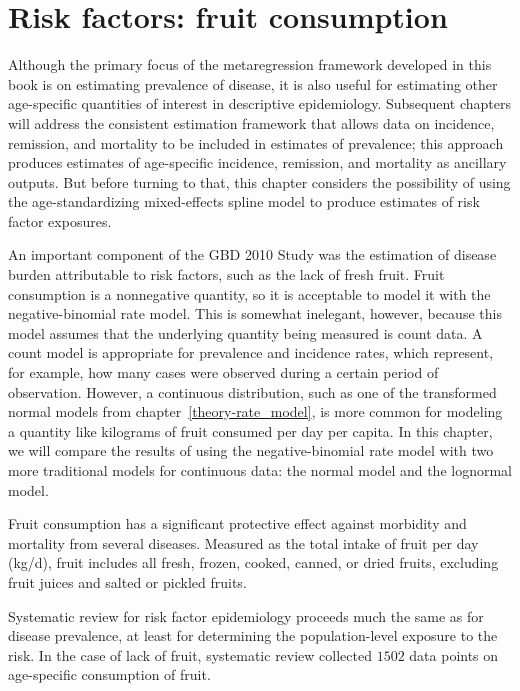 \chapter{Risk factors: fruit consumption}
\label{applications-log_normal}

Although the primary focus of the metaregression framework developed
in this book is on estimating prevalence of disease, it is also
useful for estimating other age-specific quantities of interest in
descriptive epidemiology.  Subsequent chapters will address the
consistent estimation framework that allows data on incidence,
remission, and mortality to be included in estimates of prevalence;
this approach produces estimates of age-specific incidence, remission,
and mortality as ancillary outputs.  But before turning to that,
this chapter considers the possibility of using the
age-standardizing mixed-effects spline model to produce estimates of
risk factor exposures.

An important component of the GBD 2010 Study was the estimation of
disease burden attributable to risk factors, such as the lack of fresh
fruit.  Fruit consumption is a nonnegative quantity, so it is
acceptable to model it with the negative-binomial rate model.  This is
somewhat inelegant, however, because this model assumes that the
underlying quantity being measured is count data.  A count model is
appropriate for prevalence and incidence rates, which represent, for
example, how many cases were observed during a certain period of
observation.  However, a continuous distribution, such as one of the
transformed normal models from chapter~\ref{theory-rate_model}, is
more common for modeling a quantity like kilograms of fruit consumed
per day per capita.  In this chapter, we will compare the results of
using the negative-binomial rate model with two more traditional
models for continuous data: the normal model and the lognormal model.

Fruit consumption has a significant protective
effect against morbidity and mortality from several diseases.
Measured as the total intake of fruit per day (kg/d), fruit
includes all fresh, frozen, cooked, canned, or dried fruits, excluding
fruit juices and salted or pickled fruits. \cite{he_increased_2007,
  boeing_intake_2006}

Systematic review for
risk factor epidemiology proceeds much the same as for disease
prevalence, at least for determining the population-level exposure to
the risk.  In the case of lack of fruit, systematic review collected
$1502$ data points on age-specific consumption of fruit.

